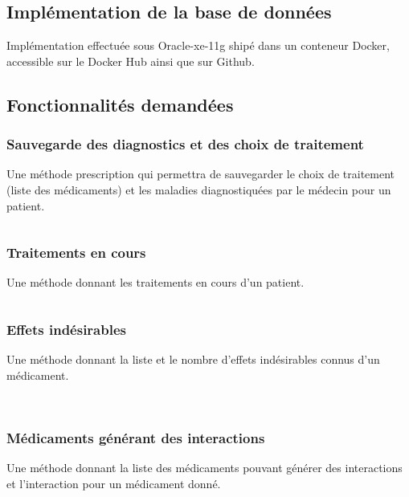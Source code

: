\documentclass[12pt,a4paper]{article}
\begin{document}
\subsection{Implémentation de la base de données}


Implémentation effectuée sous Oracle-xe-11g shipé dans un conteneur Docker, accessible sur le Docker Hub ainsi que sur Github.




\subsection{Fonctionnalités demandées}

\subsubsection{Sauvegarde des diagnostics et des choix de traitement}
Une méthode prescription qui permettra de sauvegarder le choix de traitement (liste des médicaments) et les maladies diagnostiquées par le médecin pour un patient.
\begin{lstlisting}[frame=single, language=SQL]

\end{lstlisting}




\subsubsection{Traitements en cours}
Une méthode donnant les traitements en cours d’un patient.
\begin{lstlisting}[frame=single, language=SQL]

\end{lstlisting}




\subsubsection{Effets indésirables}
Une méthode donnant la liste et le nombre d’effets indésirables connus d’un médicament.
\begin{lstlisting}[frame=single, language=SQL]
	
\end{lstlisting}



\subsubsection{Médicaments générant des interactions}
Une méthode donnant la liste des médicaments pouvant générer des interactions et l’interaction pour un médicament donné.
\begin{lstlisting}[frame=single, language=SQL]

\end{lstlisting}
\end{document}
